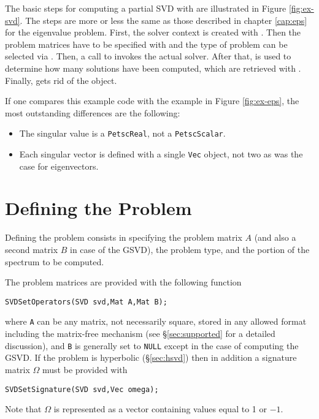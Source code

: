 The basic steps for computing a partial SVD with \slepc are illustrated in Figure \ref{fig:ex-svd}. The steps are more or less the same as those described in chapter \ref{cap:eps} for the eigenvalue problem. First, the solver context is created with . Then the problem matrices have to be specified with  and the type of problem can be selected via . Then, a call to  invokes the actual solver. After that,  is used to determine how many solutions have been computed, which are retrieved with . Finally,  gets rid of the object.

If one compares this example code with the  example in Figure \ref{fig:ex-eps}, the most outstanding differences are the following:
\begin{itemize}
\item The singular value is a \texttt{PetscReal}, not a \texttt{PetscScalar}.
\item Each singular vector is defined with a single \texttt{Vec} object, not two as was the case for eigenvectors.
\end{itemize}

\section{Defining the Problem}

Defining the problem consists in specifying the problem matrix $A$ (and also a second matrix $B$ in case of the GSVD), the problem type, and the portion of the spectrum to be computed.

The problem matrices are provided with the following function
	\begin{Verbatim}[fontsize=\small]
	SVDSetOperators(SVD svd,Mat A,Mat B);
	\end{Verbatim}
where \texttt{A} can be any matrix, not necessarily square, stored in any allowed \petsc format including the matrix-free mechanism (see \S\ref{sec:supported} for a detailed discussion), and \texttt{B} is generally set to \texttt{NULL} except in the case of computing the GSVD.
If the problem is hyperbolic (\S\ref{sec:hsvd}) then in addition a signature matrix $\Omega$ must be provided with
	\begin{Verbatim}[fontsize=\small]
	SVDSetSignature(SVD svd,Vec omega);
	\end{Verbatim}
Note that $\Omega$ is represented as a vector containing values equal to 1 or $-1$.

